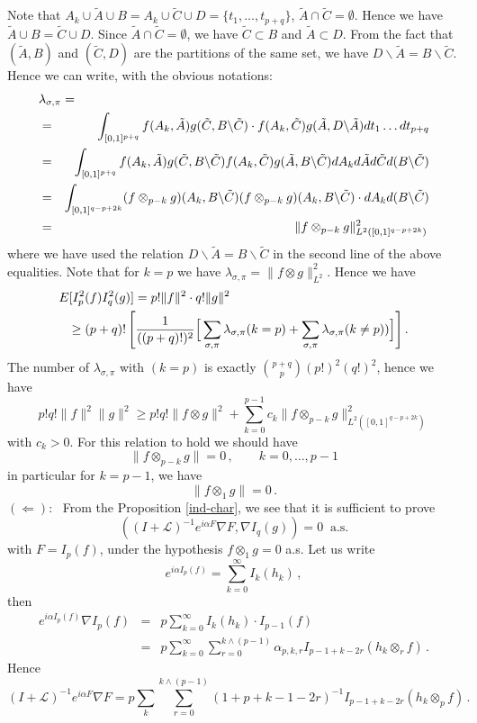 \documentclass[12pt,a4paper]{book}
\begin{document}
\noindent
Note that $A_k\cup\tilde{A}\cup B=A_k\cup\tilde{C}\cup
D=\{t_1,\ldots,t_{p+q}\}$, $\tilde{A}\cap\tilde{C}=\emptyset$. Hence we have
$\tilde{A}\cup B=\tilde{C}\cup D$. Since $\tilde{A}\cap\tilde{C}=\emptyset$, we
have $\tilde{C}\subset B$ and $\tilde{A}\subset D$. From the fact that
$(\tilde{A},B)$ and $(\tilde{C},D)$ are the partitions of the same set, we have
$D\backslash\tilde{A}=B\backslash\tilde{C}$. Hence we can write, with the
obvious notations:
\begin{eqnarray*}
\lefteqn{\lambda_{\sigma,\pi}  = }\\
& = &\int_{[0,1]^{p+q}}f(A_k,\tilde{A})g(\tilde{C},B\backslash\tilde{C})\cdot
    f(A_k,\tilde{C})g(\tilde{A},D\backslash\tilde{A})dt_1\ldots dt_{p+q} \\
& = & \int_{[0,1]^{p+q}}f(A_k,\tilde{A})g(\tilde{C},B\backslash
   \tilde{C})f(A_k,\tilde{C})g(\tilde{A},B\backslash \tilde{C})dA_k
d\tilde{A} d\tilde{C}d(B\backslash\tilde{C})\\
& = & \int_{[0,1]^{q-p+2k}}(f\otimes_{p-k}g) (A_k,B\backslash\tilde{C})
(f\otimes_{p-k}g)(A_k,B\backslash\tilde{C})\cdot dA_kd(B\backslash\tilde{C}) \\
& = & \|f\otimes_{p-k}g\|^2_{L^2([0,1]^{q-p+2k})}\,
\end{eqnarray*}
where we have used the relation $D\backslash\tilde{A}=B\backslash\tilde{C}$
in the second line of the above equalities.
\noindent
Note that for $k=p$ we have $\lambda_{\sigma,\pi}=\|f\otimes g\|_{L^2}^2$.
Hence we have
\begin{eqnarray*}
\lefteqn{E[I_p^2(f)I_q^2(g)]= p!\|f\|^2\cdot q!\|g\|^2} \\
&& \geq (p+q)! \left[
\frac{1}{((p+q)!)^2}\Big[ \sum_{\sigma,\pi}\lambda_{\sigma,\pi}(k=p)+
\sum_{\sigma,\pi}\lambda_{\sigma,\pi}(k\not= p))\Big]\right].
\end{eqnarray*}
The number  of $\lambda_{\sigma,\pi}$ with $(k=p)$ is exactly
${p+q\choose p}(p!)^2(q!)^2$, hence we have
$$
p!q!\|f\|^2\|g\|^2\geq p!q!\|f\otimes g\|^2+ \sum_{k=0}^{p-1}
c_k\|f\otimes_{p-k}g\|^2_{L^2([0,1]^{q-p+2k})}
$$
with $c_k>0$. For this relation to hold we should have
$$
\|f\otimes_{p-k}g\|=0\,,\qquad k=0,\ldots,p-1
$$
in particular for $k=p-1$, we have
$$
\|f\otimes_1g\|=0\,.
$$
$(\Leftarrow)$: \ From the Proposition \ref{ind-char}, we see that it
is sufficient to prove
$$
((I+{\mathcal L})^{-1}e^{i\alpha F}\nabla F,\nabla I_q(g))=0\;\;{\mbox{a.s.}}
$$
with $F=I_p(f)$, under the hypothesis $f\otimes_1g=0$ a.s.  Let us write
$$
e^{i\alpha I_p(f)}=\sum_{k=0}^\infty I_k(h_k)\,,
$$
then
\begin{eqnarray*}
e^{i\alpha I_p(f)}\nabla I_p(f) & = & p\sum_{k=0}^\infty I_k(h_k)\cdot I_{p-1}(f) \\
& = & p\sum_{k=0}^\infty\sum_{r=0}^{k\wedge(p-1)} \alpha_{p,k,r}
I_{p-1+k-2r}(h_k\otimes_r f)\,.
\end{eqnarray*}
Hence
$$
(I+{\mathcal L})^{-1}e^{i\alpha F}\nabla F=
p\sum_k\!\!\sum_{r=0}^{k\wedge(p-1)}(1+p+k-1-2r)^{-1}
       I_{p-1+k-2r}(h_k\otimes_p f)\,.
$$
\end{document}
